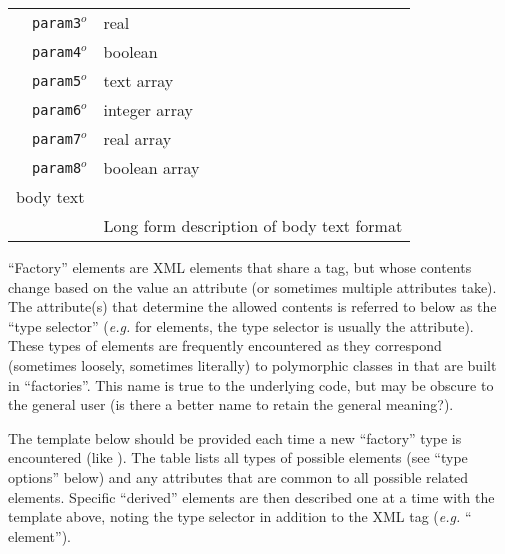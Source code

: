 \begin{table}[h]
\begin{center}
\begin{tabularx}{\textwidth}{l l l l l X }
   &   \texttt{param3}$^o$&  real              &                  &                     &                       \\
   &   \texttt{param4}$^o$&  boolean           &                  &                     &                       \\
   &   \texttt{param5}$^o$&  text array        &                  &                     &                       \\
   &   \texttt{param6}$^o$&  integer array     &                  &                     &                       \\
   &   \texttt{param7}$^o$&  real array        &                  &                     &                       \\
   &   \texttt{param8}$^o$&  boolean array     &                  &                     &                       \\
\multicolumn{2}{l}{body text}  & \multicolumn{4}{l}{}\\
   &                           & \multicolumn{4}{l}{Long form description of body text format}                   \\
  \hline
\end{tabularx}
\end{center}
\end{table}
\FloatBarrier



``Factory'' elements are XML elements that share a tag, but whose contents change based on the value an attribute (or sometimes multiple attributes take).  The attribute(s) that determine the allowed contents is referred to below as the ``type selector''  (\textit{e.g.} for  elements, the type selector is usually the  attribute).  These types of elements are frequently encountered as they correspond (sometimes loosely, sometimes literally) to polymorphic classes in \qmcpack that are built in ``factories''.  This name is true to the underlying code, but may be obscure to the general user (is there a better name to retain the general meaning?).   

The template below should be provided each time a new ``factory'' type is encountered (like ).  The table lists all types of possible elements (see ``type options'' below) and any attributes that are common to all possible related elements.  Specific ``derived'' elements are then described one at a time with the template above, noting the type selector in addition to the XML tag (\textit{e.g.} `` element'').

